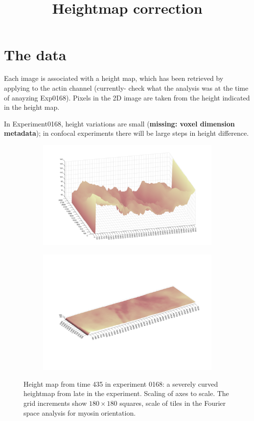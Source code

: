 \documentclass[10pt,a4paper]{article}
\title{Heightmap correction}
\begin{document}
\section{The data}
Each image is associated with a height map, which has been retrieved by applying \texttt{} to the actin channel (currently- check what the analysis was at the time of anayzing Exp0168).  Pixels in the 2D image are taken from the height indicated in the height map.  

In Experiment0168, height variations are small (\textbf{missing: voxel dimension metadata}); in confocal experiments there will be large steps in height difference.

\begin{figure}
\begin{subfigure}{\textwidth}
\centering
\includegraphics[width=\textwidth]{435_example2.png}
\end{subfigure}
\begin{subfigure}{\textwidth}
\includegraphics[width=\textwidth]{435_flat.png}
\end{subfigure}
\caption{Height map from time 435 in experiment 0168: a severely curved heightmap from late in the experiment.  Scaling of axes to scale.  The grid increments show $180 \times 180$ squares, scale of tiles in the Fourier space analysis for myosin orientation.}
\end{figure}
\end{document}
